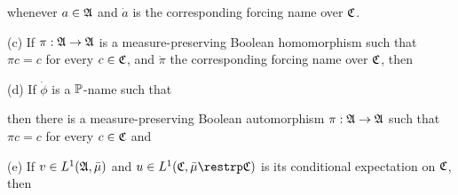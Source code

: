 \noindent whenever $a\in\frak A$ and $\dot a$ is the corresponding
forcing name over $\frak C$.

(c) If $\pi:\frak A\to\frak A$ is a measure-preserving Boolean
homomorphism such that $\pi c=c$ for every $c\in\frak C$, and
$\dot\pi$ the corresponding forcing name over $\frak C$,
then


(d) If $\dot\phi$ is a $\Bbb P$-name such that


\noindent then there is a measure-preserving Boolean automorphism
$\pi:\frak A\to\frak A$ such that $\pi c=c$ for every $c\in\frak C$ and


(e) If $v\in L^1(\frak A,\bar\mu)$ and
$u\in L^1(\frak C,\bar\mu\restrp\frak C)$ is its conditional expectation
on $\frak C$, then


